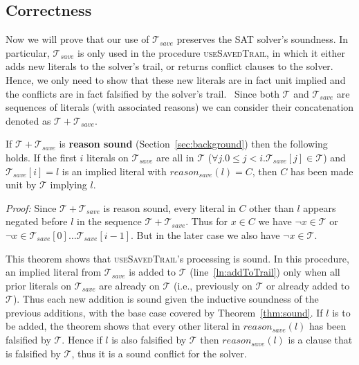 \documentclass[runningheads]{llncs}
\newcommand{\sat}{SAT\xspace}
\newcommand{\trail}{\ensuremath{\mathcal{T}}}
\newcommand{\reasonsave}[1]{\ensuremath{\mathit{reason_{\mathit{save}}(#1)}}}
\newcommand{\trailsave}{\trail_{\mathit{save}}}
\newcommand{\ust}{\textsc{useSavedTrail}\xspace}
\newcommand{\whitebox}{\raisebox{.5ex}{\fbox{\hspace*{.2ex}}}}
\begin{document}
\subsection{Correctness}
Now we will prove that our use of $\trailsave$ preserves the \sat
solver's soundness. In particular, $\trailsave$ is only used in the
procedure \ust, in which it either adds new literals
to the solver's trail, or returns conflict clauses to the solver.
Hence, we only need to show that these new literals are in fact unit
implied and the conflicts are in fact falsified by the solver's trail.
\
Since both $\trail$ and $\trailsave$ are sequences of literals (with
associated reasons) we can consider their concatenation denoted as
$\trail + \trailsave$.
\begin{theorem}
    \label{thm:sound}
    If $\trail + \trailsave$ is \textbf{reason sound}
    (Section~\ref{sec:background}) then the following holds.  If the
    first $i$ literals on $\trailsave$ are all in $\trail$
    ($\forall j. 0\leq j< i. \trailsave[j]\in \trail$) and
    $\trailsave[i]=l$ is an implied literal with $\reasonsave{l} = C$,
    then $C$ has been made unit by $\trail$ implying $l$.
\end{theorem}
\noindent\emph{Proof:}
Since $\trail + \trailsave$ is reason sound, every literal in $C$
other than $l$ appears negated before $l$ in the sequence
$\trail + \trailsave$. Thus for $x\in C$ we have $\lnot x \in \trail$
or $\lnot x \in \trailsave[0]\ldots\trailsave[i-1]$. But in the later
case we also have $\lnot x \in \trail$. 
\whitebox

This theorem shows that \ust's processing is
sound. In this procedure, an implied literal from $\trailsave$ is added
to $\trail$ (line~\ref{ln:addToTrail}) only when all prior literals on
$\trailsave$ are already on $\trail$ (i.e., previously on $\trail$ or
already added to $\trail$). Thus each new addition is sound given the
inductive soundness of the previous additions, with the base case
covered by Theorem~\ref{thm:sound}. If $l$ is to be added, the theorem
shows that every other literal in $\reasonsave{l}$ has been falsified
by $\trail$. Hence if $l$ is also falsified by $\trail$ then
$\reasonsave{l}$ is a clause that is falsified by $\trail$, thus it is
a sound conflict for the solver.
\end{document}
